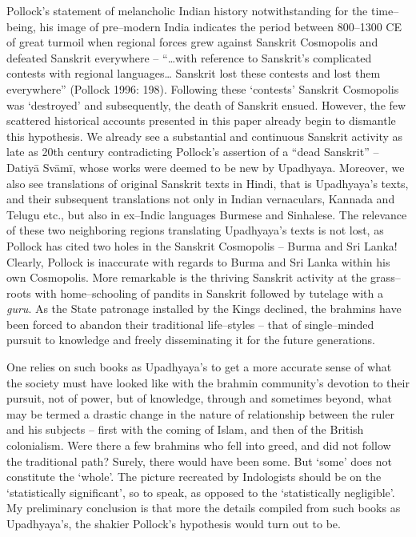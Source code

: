 Pollock’s statement of melancholic Indian history notwithstanding for the time–being, his image of pre–modern India indicates the period between 800–1300 CE of great turmoil when regional forces grew against Sanskrit Cosmopolis and defeated Sanskrit everywhere – “…with reference to Sanskrit’s complicated contests with regional languages… Sanskrit lost these contests and lost them everywhere” (Pollock 1996: 198). Following these ‘contests’ Sanskrit Cosmopolis was ‘destroyed’ and subsequently, the death of Sanskrit ensued. However, the few scattered historical accounts presented in this paper already begin to dismantle this hypothesis. We already see a substantial and continuous Sanskrit activity as late as 20th century contradicting Pollock’s assertion of a “dead Sanskrit” – Datiyā Svāmī, whose works were deemed to be new by Upadhyaya. Moreover, we also see translations of original Sanskrit texts in Hindi, that is Upadhyaya’s texts, and their subsequent translations not only in Indian vernaculars, Kannada and Telugu etc., but also in ex–Indic languages Burmese and Sinhalese. The relevance of these two neighboring regions translating Upadhyaya’s texts is not lost, as Pollock has cited two holes in the Sanskrit Cosmopolis – Burma and Sri Lanka! Clearly, Pollock is inaccurate with regards to Burma and Sri Lanka within his own Cosmopolis. More remarkable is the thriving Sanskrit activity at the grass–roots with home–schooling of pandits in Sanskrit followed by tutelage with a \textit{guru}. As the State patronage installed by the Kings declined, the brahmins have been forced to abandon their traditional life–styles – that of single–minded pursuit to knowledge and freely disseminating it for the future generations.

One relies on such books as Upadhyaya’s to get a more accurate sense of what the society must have looked like with the brahmin community’s devotion to their pursuit, not of power, but of knowledge, through and sometimes beyond, what may be termed a drastic change in the nature of relationship between the ruler and his subjects – first with the coming of Islam, and then of the British colonialism. Were there a few brahmins who fell into greed, and did not follow the traditional path? Surely, there would have been some. But ‘some’ does not constitute the ‘whole’. The picture recreated by Indologists should be on the ‘statistically significant’, so to speak, as opposed to the ‘statistically negligible’. My preliminary conclusion is that more the details compiled from such books as Upadhyaya’s, the shakier Pollock’s hypothesis would turn out to be.


